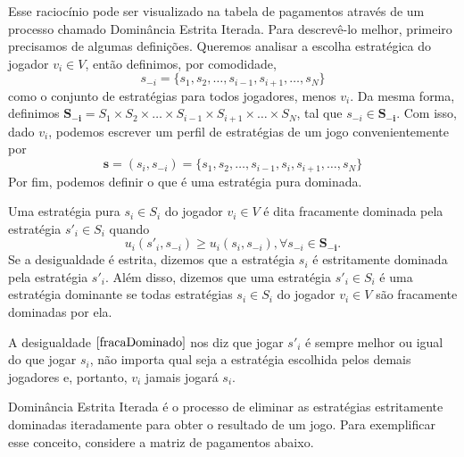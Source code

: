 Esse raciocínio pode ser visualizado na tabela de pagamentos através de um processo chamado Dominância Estrita Iterada. Para descrevê-lo melhor, primeiro precisamos de algumas definições. Queremos analisar a escolha estratégica do jogador $v_i\in V$, então definimos, por comodidade,
\begin{equation*}
    s_{-i}=\{s_{1},s_{2},\dots,s_{i-1},s_{i+1},\dots,s_{N}\}
\end{equation*}
como o conjunto de estratégias para todos jogadores, menos $v_i$. Da mesma forma, definimos $\boldsymbol{S_{-i}}=S_1\times S_2\times\dots\times S_{i-1}\times S_{i+1}\times\dots\times S_N$, tal que $s_{-i}\in \boldsymbol{S_{-i}}$. Com isso, dado $v_i$, podemos escrever um perfil de estratégias de um jogo convenientemente por
\begin{equation*}
    \boldsymbol{s}=(s_{i},s_{-i})=\{s_{1},s_{2},\dots,s_{i-1},s_{i},s_{i+1},\dots,s_{N}\}
\end{equation*}
Por fim, podemos definir o que é uma estratégia pura dominada.
\begin{definition}
    Uma estratégia pura $s_{i}\in S_i$ do jogador $v_i\in V$ é dita fracamente dominada pela estratégia $s'_{i}\in S_i$ quando
    \begin{equation}
        u_i(s'_{i},s_{-i})\geq u_i(s_{i},s_{-i}), \forall s_{-i}\in \boldsymbol{S_{-i}}.
        \label{fracaDominado}
    \end{equation}
    Se a desigualdade é estrita, dizemos que a estratégia $s_{i}$ é estritamente dominada pela estratégia $s'_{i}$. Além disso, dizemos que uma estratégia $s'_i\in S_i$ é uma estratégia dominante se todas estratégias $s_{i}\in S_i$ do jogador $v_i\in V$ são fracamente dominadas por ela.
\end{definition}

A desigualdade $\eqref{fracaDominado}$ nos diz que jogar $s'_{i}$ é sempre melhor ou igual do que jogar $s_i$, não importa qual seja a estratégia escolhida pelos demais jogadores e, portanto, $v_i$ jamais jogará $s_i$.

Dominância Estrita Iterada é o processo de eliminar as estratégias estritamente dominadas iteradamente para obter o resultado de um jogo. Para exemplificar esse conceito, considere a matriz de pagamentos abaixo.

